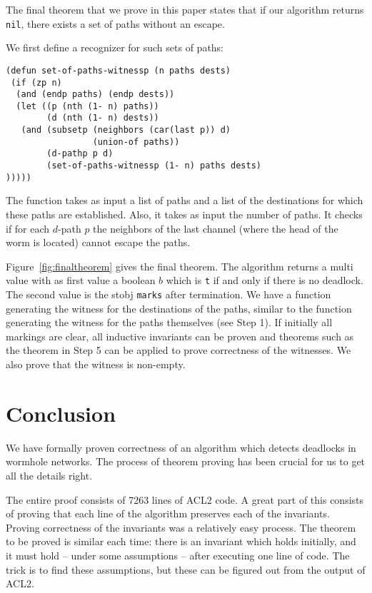 \documentclass[submission,copyright]{eptcs}
\begin{document}
The final theorem that we prove in this paper states that if our algorithm returns {\tt nil}, there exists a set of paths without an escape.

We first define a recognizer for such sets of paths:
\begin{verbatim}
(defun set-of-paths-witnessp (n paths dests)
 (if (zp n)
  (and (endp paths) (endp dests))
  (let ((p (nth (1- n) paths))
        (d (nth (1- n) dests))
   (and (subsetp (neighbors (car(last p)) d)
                 (union-of paths))
        (d-pathp p d)
        (set-of-paths-witnessp (1- n) paths dests)
)))))
\end{verbatim}
The function takes as input a list of paths and a list of the destinations for which these paths are established. Also, it takes as input the number of paths. It checks if for each $d$-path $p$ the neighbors of the last channel (where the head of the worm is located) cannot escape the paths.

Figure~\ref{fig:finaltheorem} gives the final theorem.
The algorithm returns a multi value with as first value a boolean $b$ which is {\tt t} if and only if there is no deadlock. The second value is the stobj {\tt marks} after termination. We have a function generating the witness for the destinations of the paths, similar to the function generating the witness for the paths themselves (see Step 1). If initially all markings are clear, all inductive invariants can be proven and theorems such as the theorem in Step 5 can be applied to prove correctness of the witnesses.  We also prove that the witness is non-empty.

\section{Conclusion}\label{sec:conclusion}

We have formally proven correctness of an algorithm which detects deadlocks in wormhole networks.
The process of theorem proving has been crucial for us to get all the details right.

The entire proof consists of 7263 lines of ACL2 code. A great part of this consists of proving that each line of the algorithm preserves each of the invariants.
Proving correctness of the invariants was a relatively easy process.
The theorem to be proved is similar each time: there is an invariant which holds initially, and it must hold -- under some assumptions -- after executing one line of code.
The trick is to find these assumptions, but these can be figured out from the output of ACL2.
\end{document}

